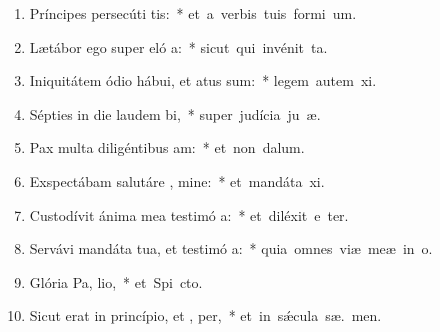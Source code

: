 \begin{flushleft}
\begin{enumerate}[leftmargin=*]

\item Príncipes persecúti   tis:~* \mbox{et a verbis tuis formi  um.}
\item Lætábor ego super eló a:~* \mbox{sicut qui invénit  ta.}
\item Iniquitátem ódio hábui, et atus sum:~* \mbox{legem autem  xi.}
\item Sépties in die laudem  bi,~* \mbox{super judícia ju æ.}
\item Pax multa diligéntibus  am:~* \mbox{et non   dalum.}
\item Exspectábam salutáre , mine:~* \mbox{et mandáta  xi.}
\item Custodívit ánima mea testimó a:~* \mbox{et diléxit e ter.}
\item Servávi mandáta tua, et testimó a:~* \mbox{quia omnes viæ meæ in  o.}
\item Glória Pa,  lio,~* \mbox{et Spi cto.}
\item Sicut erat in princípio, et ,  per,~* \mbox{et in s\'{\ae}cula sæ. men.}


\end{enumerate}
\end{flushleft}

